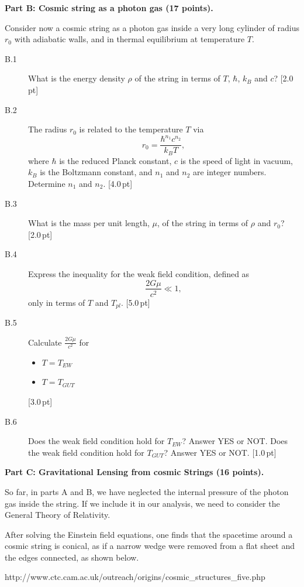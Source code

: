 \medskip
\textbf{Part B: Cosmic string as a photon gas (17 points).}

Consider now a cosmic string as a photon gas inside a very long cylinder of
radius $r_0$ with adiabatic walls, and in thermal equilibrium at temperature
$T$.

\begin{description}
\item[B.1] What is the energy density $\rho$ of the string in terms of $T$,
  $\hbar$, $k_B$ and $c$? \hfill[2.0\,pt]
\item[B.2] The radius $r_0$ is related to the temperature $T$ via
  \[ r_0 = \frac{\hbar^{n_1} c^{n_2}}{k_B T}, \]
  where $\hbar$ is the reduced Planck constant, $c$ is the speed of light in
  vacuum, $k_B$ is the Boltzmann constant, and $n_1$ and $n_2$ are integer
  numbers. Determine $n_1$ and $n_2$. \hfill[4.0\,pt]
\item[B.3] What is the mass per unit length, $\mu$, of the string in terms of
  $\rho$ and $r_0$? \hfill[2.0\,pt]
\item[B.4] Express the inequality for the weak field condition, defined as
  \[ \frac{2G\mu}{c^2} \ll 1, \]
  only in terms of $T$ and $T_{pl}$. \hfill[5.0\,pt]
\item[B.5] Calculate $\frac{2G\mu}{c^2}$ for
  \begin{itemize}
  \item $T = T_{EW}$
  \item $T = T_{GUT}$
  \end{itemize}
  \hfill[3.0\,pt]
\item[B.6] Does the weak field condition hold for $T_{EW}$? Answer YES or NOT.
  Does the weak field condition hold for $T_{GUT}$? Answer YES or NOT.
  \hfill[1.0\,pt]
\end{description}

\medskip
\textbf{Part C: Gravitational Lensing from cosmic Strings (16 points).}

So far, in parts A and B, we have neglected the internal pressure of the
photon gas inside the string. If we include it in our analysis, we need to
consider the General Theory of Relativity.

After solving the Einstein field equations, one finds that the spacetime
around a cosmic string is conical, as if a narrow wedge were removed from a
flat sheet and the edges connected, as shown below.


{\centering\small
http://www.ctc.cam.ac.uk/outreach/origins/cosmic\_structures\_five.php\par}

